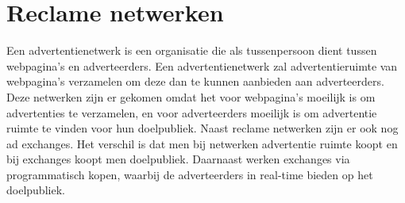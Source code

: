\documentclass[pdftex,a4paper,12pt,twoside]{report}
\begin{document}
\section{Reclame netwerken}
\label{sec:Reclame netwerken}
Een advertentienetwerk is een organisatie die als tussenpersoon dient tussen webpagina's en adverteerders. Een advertentienetwerk zal advertentieruimte van webpagina's verzamelen om deze dan te kunnen aanbieden aan adverteerders. Deze netwerken zijn er gekomen omdat het voor webpagina's moeilijk is om advertenties te verzamelen, en voor adverteerders moeilijk is om advertentie ruimte te vinden voor hun doelpubliek. Naast reclame netwerken zijn er ook nog ad exchanges. Het verschil is dat men bij netwerken advertentie ruimte koopt en bij exchanges koopt men doelpubliek. Daarnaast werken exchanges via programmatisch kopen, waarbij de adverteerders in real-time bieden op het doelpubliek.
\end{document}
